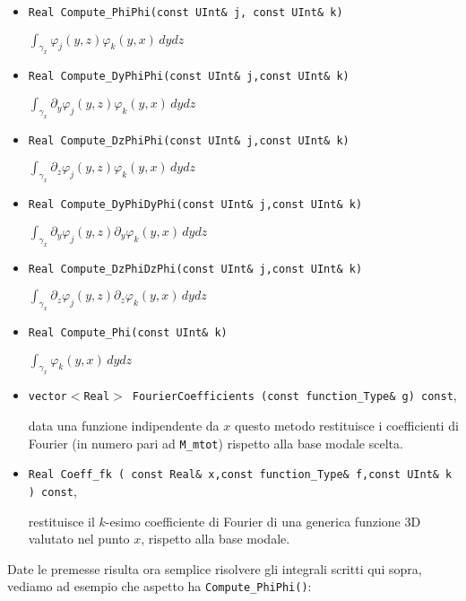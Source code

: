 \begin{itemize}
\item \texttt{Real Compute\_PhiPhi(const UInt\& j, const UInt\& k)}

 $\int_{\gamma_x}\varphi_j(y,z)\varphi_k(y,x) \,dydz$

\item \texttt{Real Compute\_DyPhiPhi(const UInt\& j,const UInt\& k)} 

$\int_{\gamma_x} \partial_y \varphi_j(y,z)\varphi_k(y,x) \,dydz$

\item \texttt{Real Compute\_DzPhiPhi(const UInt\& j,const UInt\& k)} 

$\int_{\gamma_x} \partial_z \varphi_j(y,z)\varphi_k(y,x) \,dydz$

\item \texttt{Real Compute\_DyPhiDyPhi(const UInt\& j,const UInt\& k)} 

$\int_{\gamma_x} \partial_y \varphi_j(y,z)\partial_y\varphi_k(y,x) \,dydz$

\item \texttt{Real Compute\_DzPhiDzPhi(const UInt\& j,const UInt\& k)} 

$\int_{\gamma_x} \partial_z \varphi_j(y,z)\partial_z\varphi_k(y,x) \,dydz$

\item \texttt{Real Compute\_Phi(const UInt\& k)} 

$\int_{\gamma_x} \varphi_k(y,x) \,dydz$

\item \texttt{vector$<$Real$>$ FourierCoefficients (const function\_Type\& g) const},

data una funzione indipendente da $x$ questo metodo restituisce i coefficienti di Fourier (in numero pari ad \texttt{M\_mtot}) rispetto alla base modale scelta.

\item \texttt{Real Coeff\_fk (	const Real\& x,const function\_Type\& f,const UInt\& k ) const},

restituisce il $k$-esimo coefficiente di Fourier di una generica funzione 3D valutato nel punto $x$, rispetto alla base modale.
\end{itemize}

Date le premesse risulta ora semplice risolvere gli integrali scritti qui sopra, vediamo ad esempio che aspetto ha \texttt{Compute\_PhiPhi()}:


